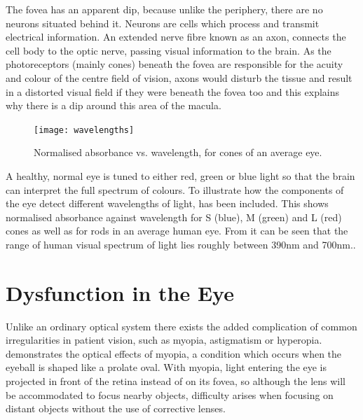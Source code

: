The fovea has an apparent dip, because unlike the periphery, there are
no neurons situated behind it. Neurons are cells which process and
transmit electrical information. An extended nerve fibre known as an axon,
connects the cell body to the optic nerve, passing visual information to the
brain. As the photoreceptors (mainly cones) beneath the fovea are responsible
for the acuity and colour of the centre field of vision, axons would disturb the
tissue and result in a distorted visual field if they were beneath the fovea too
and this explains why there is a dip around this area of the macula.
 
 \begin{figure}[H]
\centering
  \texttt{[image: wavelengths]}
\caption{Normalised absorbance vs. wavelength, for cones of an average eye.\cite{wikicones}}
\label{fig:wavelengths}
\end{figure}

A healthy, normal eye is tuned to either red, green or blue light so that the
brain can interpret the full spectrum of colours. To illustrate how the
components of the eye detect different wavelengths of light,
 has been included. This shows normalised absorbance
against wavelength for S (blue), M (green) and L (red) cones as well as for
rods in an average human eye.  From  it can be seen
that the range of human visual spectrum of light lies roughly between 390nm
and 700nm.\cite{starr2010biology}.

\section{Dysfunction in the Eye}

Unlike an ordinary optical system there exists the added complication
of common irregularities in patient vision, such as myopia, astigmatism
or hyperopia.  demonstrates the optical effects of myopia,
a condition which occurs when the eyeball is shaped like a prolate oval.
\cite{saine2002ophthalmic} With myopia, light entering the eye is projected
in front of the retina instead of on its fovea, so although the lens will be
accommodated to focus nearby objects, difficulty arises when focusing on 
distant objects without the use of corrective lenses.

